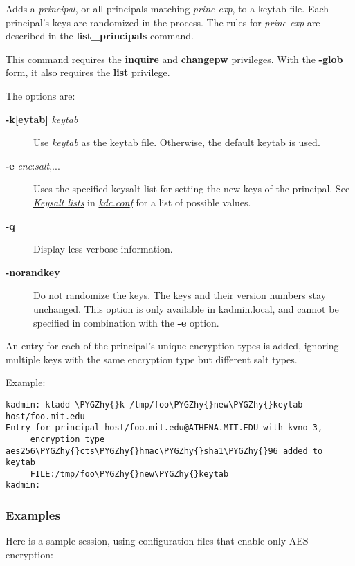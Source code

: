 \documentclass[letterpaper,10pt,english]{sphinxmanual}
\def\PYGZhy{\char`\-}
\begin{document}
Adds a \emph{principal}, or all principals matching \emph{princ-exp}, to a
keytab file.  Each principal's keys are randomized in the process.
The rules for \emph{princ-exp} are described in the \textbf{list\_principals}
command.

This command requires the \textbf{inquire} and \textbf{changepw} privileges.
With the \textbf{-glob} form, it also requires the \textbf{list} privilege.

The options are:
\begin{description}
\item[{\textbf{-k{[}eytab{]}} \emph{keytab}}] \leavevmode
Use \emph{keytab} as the keytab file.  Otherwise, the default keytab is
used.

\item[{\textbf{-e} \emph{enc}:\emph{salt},...}] \leavevmode
Uses the specified keysalt list for setting the new keys of the
principal.  See {\hyperref[admin/conf_files/kdc_conf:keysalt-lists]{\emph{Keysalt lists}}} in {\hyperref[admin/conf_files/kdc_conf:kdc-conf-5]{\emph{kdc.conf}}} for a
list of possible values.

\item[{\textbf{-q}}] \leavevmode
Display less verbose information.

\item[{\textbf{-norandkey}}] \leavevmode
Do not randomize the keys. The keys and their version numbers stay
unchanged.  This option is only available in kadmin.local, and
cannot be specified in combination with the \textbf{-e} option.

\end{description}

An entry for each of the principal's unique encryption types is added,
ignoring multiple keys with the same encryption type but different
salt types.

Example:

\begin{Verbatim}[commandchars=\\\{\}]
kadmin: ktadd \PYGZhy{}k /tmp/foo\PYGZhy{}new\PYGZhy{}keytab host/foo.mit.edu
Entry for principal host/foo.mit.edu@ATHENA.MIT.EDU with kvno 3,
     encryption type aes256\PYGZhy{}cts\PYGZhy{}hmac\PYGZhy{}sha1\PYGZhy{}96 added to keytab
     FILE:/tmp/foo\PYGZhy{}new\PYGZhy{}keytab
kadmin:
\end{Verbatim}


\subsubsection{Examples}
\label{admin/appl_servers:examples}
Here is a sample session, using configuration files that enable only
AES encryption:
\end{document}
